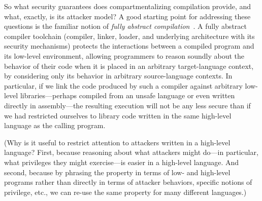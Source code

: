 \documentclass[10pt, conference, compsocconf, letterpaper, times]{IEEEtran}
\begin{document}
So what security guarantees does compartmentalizing compilation provide,
and what, exactly, is its attacker model?
A good starting point for addressing these questions is the familiar notion
of {\em fully abstract compilation}~\cite{abadi_protection98,
  PatrignaniASJCP15, AgtenSJP12, abadi_aslr12, JagadeesanPRR11,
  FournetSCDSL13, AbadiPP13, AbadiP13, AhmedB11, AhmedB08, NewBA16}.
A fully abstract compiler toolchain (compiler, linker, loader, and
underlying architecture with its security mechanisms) protects the
interactions between a compiled program and its low-level environment,
allowing programmers to reason
soundly about the behavior of their code when it is placed in an arbitrary
target-language context, by considering only its behavior in arbitrary
source-language contexts.
In particular, if we link the code produced by such a compiler against
arbitrary low-level libraries---perhaps compiled from an unsafe language or
even written directly in assembly---the resulting execution will not be any less
secure than if we had restricted ourselves to library code written in the
same high-level language as the calling program.  

(Why is it useful to
restrict attention to attackers written in a high-level language?  First,
because reasoning about what attackers might do---in particular, what
privileges they might exercise---is easier in a high-level language.  And
second, because by phrasing the property in terms of low- and
high-level programs rather than directly in terms of attacker behaviors,
specific notions of privilege, etc., we can re-use the same property for
many different languages.)
\iflater
{}
\fi
\end{document}
